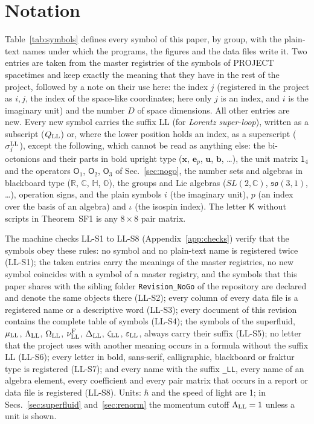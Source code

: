 \appendix
\onecolumngrid

\section{Notation}
\label{app:notation}

Table~\ref{tab:symbols} defines every symbol of this paper, by group, with the plain-text names under
which the programs, the figures and the data files write it. Two entries are taken from the master
registries of the symbols of PROJECT spacetimes and keep exactly the meaning that they have in the
rest of the project, followed by a note on their use here: the index $j$ (registered in the project as
$i,j$, the index of the space-like coordinates; here only $j$ is an index, and $i$ is the imaginary
unit) and the number $D$ of space dimensions. All other entries are new. Every new symbol carries the
suffix LL (for \emph{Lorentz super-loop}), written as a subscript ($Q_{\rm LL}$) or, where the lower
position holds an index, as a superscript ($\sigma^{\rm LL}_j$), except the following, which cannot be
read as anything else: the bi-octonions and their parts in bold upright type ($\mathbf x$, $\mathbf
e_p$, $\mathbf u$, $\mathbf b$, \dots), the unit matrix $\mathsf 1_4$ and the operators $\mathsf O_1$,
$\mathsf O_2$, $\mathsf O_3$ of Sec.~\ref{sec:nogo}, the number sets and algebras in blackboard type
($\mathbb R$, $\mathbb C$, $\mathbb H$, $\mathbb O$), the groups and Lie algebras ($SL(2,\mathbb C)$,
$\mathfrak{so}(3,1)$, \dots), operation signs, and the plain symbols $i$ (the imaginary unit), $p$ (an
index over the basis of an algebra) and $\iota$ (the isospin index). The letter $\mathsf K$ without
scripts in Theorem~SF1 is any $8\times8$ pair matrix.

The machine checks LL-S1 to LL-S8 (Appendix~\ref{app:checks}) verify that the symbols obey these rules:
no symbol and no plain-text name is registered twice (LL-S1); the taken entries carry the meanings of
the master registries, no new symbol coincides with a symbol of a master registry, and the symbols that
this paper shares with the sibling folder \texttt{Revision\_NoGo} of the repository are declared and
denote the same objects there (LL-S2); every column of every data file is a registered name or a
descriptive word (LL-S3); every document of this revision contains the complete table of symbols
(LL-S4); the symbols of the superfluid, $\mu_{\rm LL}$, $\Lambda_{\rm LL}$, $\Omega_{\rm LL}$,
$\nu^{\rm F}_{\rm LL}$, $\Delta_{\rm LL}$, $\zeta_{\rm LL}$, $\varepsilon_{\rm LL}$, always carry their suffix
(LL-S5); no letter that the project uses with another meaning occurs in a formula without the suffix
LL (LL-S6); every letter in bold, sans-serif, calligraphic, blackboard or fraktur type is registered
(LL-S7); and every name with the suffix \texttt{\_LL}, every name of an algebra element, every
coefficient and every pair matrix that occurs in a report or data file is registered (LL-S8). Units:
$\hbar$ and the speed of light are 1; in Secs.~\ref{sec:superfluid} and~\ref{sec:renorm} the momentum
cutoff $\Lambda_{\rm LL}=1$ unless a unit is shown.

